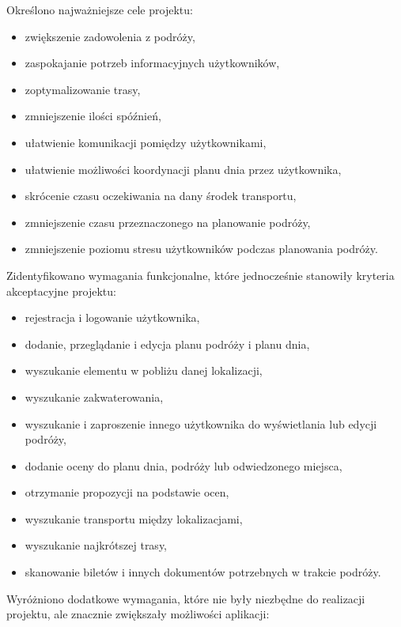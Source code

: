 \documentclass[10pt,twoside,a4paper]{report}
\begin{document}
\par
\noindent \newline Określono najważniejsze cele projektu:

\begin{itemize}
\item zwiększenie zadowolenia z podróży,
\item zaspokajanie potrzeb informacyjnych użytkowników,
\item zoptymalizowanie trasy,
\item zmniejszenie ilości spóźnień,
\item ułatwienie komunikacji pomiędzy użytkownikami,
\item ułatwienie możliwości koordynacji planu dnia przez użytkownika,
\item skrócenie czasu oczekiwania na dany środek transportu,
\item zmniejszenie czasu przeznaczonego na planowanie podróży,
\item zmniejszenie poziomu stresu użytkowników podczas planowania podróży.
\end{itemize}

\par
\noindent\newline Zidentyfikowano wymagania funkcjonalne, które jednocześnie stanowiły kryteria akceptacyjne projektu: 

\begin{itemize}
\item rejestracja i logowanie użytkownika,
\item dodanie, przeglądanie i edycja planu podróży i planu dnia,
\item wyszukanie elementu w pobliżu danej lokalizacji,
\item wyszukanie zakwaterowania,
\item wyszukanie i zaproszenie innego użytkownika do wyświetlania lub edycji podróży,
\item dodanie oceny do planu dnia, podróży lub odwiedzonego miejsca,
\item otrzymanie propozycji na podstawie ocen,
\item wyszukanie transportu między lokalizacjami,
\item wyszukanie najkrótszej trasy,
\item skanowanie biletów i innych dokumentów potrzebnych w trakcie podróży.
\end{itemize}

\par
\noindent Wyróżniono dodatkowe wymagania, które nie były niezbędne do realizacji projektu, ale znacznie zwiększały możliwości aplikacji: 
\end{document}
